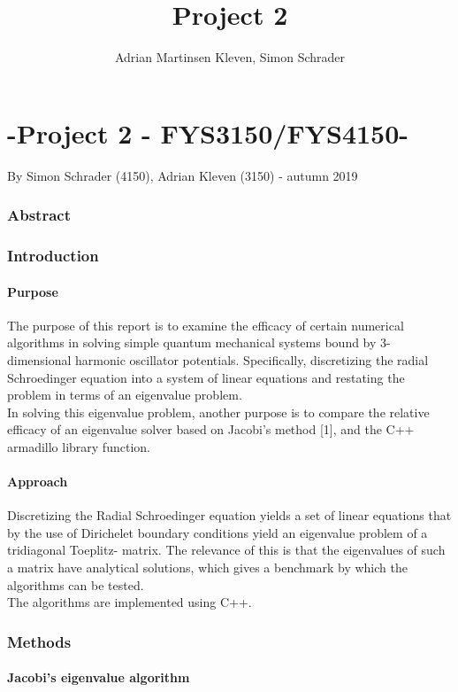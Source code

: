 \documentclass[10pt,a4paper]{article}
\author{Adrian Martinsen Kleven, Simon Schrader}
\title{Project 2}
\begin{document}
\part*{-Project 2 - FYS3150/FYS4150-
}
{\large By Simon Schrader (4150), Adrian Kleven (3150) - autumn 2019
}
\tableofcontents

\listoffigures
\listoftables

 
\clearpage
 
\section{Abstract}

\section{Introduction}
\subsection{Purpose} 
The purpose of this report is to examine the efficacy of certain numerical algorithms in solving simple quantum mechanical systems bound by 3- dimensional harmonic oscillator potentials. Specifically, discretizing the radial Schroedinger equation into a system of linear equations and restating the problem in terms of an eigenvalue problem.\\In solving this eigenvalue problem, another purpose is to compare the relative efficacy of an eigenvalue solver based on Jacobi's method [1], and the C++ armadillo library function.
\subsection{Approach}
Discretizing the Radial Schroedinger equation yields a set of linear equations that by the use of Dirichelet boundary conditions yield an eigenvalue problem of a tridiagonal Toeplitz- matrix. The relevance of this is that the eigenvalues of such a matrix have analytical solutions, which gives a benchmark by which the algorithms can be tested.\\The algorithms are implemented using C++.
\section{Methods}

\subsection{Jacobi's eigenvalue algorithm}\label{jacobi algo}
\end{document}
